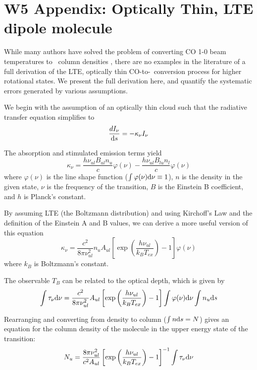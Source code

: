 \section{W5 Appendix: Optically Thin, LTE dipole molecule}
\label{appendix:dipole}
While many authors have solved the problem of converting CO 1-0 beam
temperatures to \hh\ column densities
\citep{garden1991,bourke1997,Cabrit1990,lada1996}, there are no  examples in
the literature of a full derivation of the LTE, optically thin CO-to-\hh\
conversion process for higher rotational states.  We present the full
derivation here, and quantify the systematic errors generated by various
assumptions.

We begin with the assumption of an optically thin cloud such that the radiative
transfer equation \citep[][eqn 1.9]{rohlfs} simplifies to
\begin{equation}
  \label{eqn:radtrans}
  \frac{dI_\nu}{\textrm{d}s} = -\kappa_\nu I_\nu 
\end{equation}

The absorption and stimulated emission terms yield 
\begin{equation}
  \label{eqn:kappa}
  \kappa_\nu = \frac{h \nu_{ul} B_{ul} n_u}{c} \varphi(\nu)
              -\frac{h \nu_{ul} B_{lu} n_l}{c} \varphi(\nu)
\end{equation}
where $\varphi(\nu)$ is the line shape function ($\int\varphi(\nu) \textrm{d}\nu \equiv
1$), $n$ is the density in the given state, $\nu$ is the frequency of the transition,
$B$ is the Einstein B coefficient, and $h$ is Planck's constant.

By assuming LTE (the Boltzmann distribution) and using Kirchoff's Law and the definition of 
the Einstein A and B values, we can derive a more useful version of this equation
\begin{equation}
  \kappa_\nu = \frac{c^2}{8 \pi \nu_{ul}^2} n_u A_{ul} \left[\exp\left(\frac{h \nu_{ul} }{k_B T_{ex}}\right) - 1 \right] \varphi(\nu)
\end{equation}
where $k_B$ is Boltzmann's constant.

The observable $T_B$ can be related to the optical depth, which is given by 
\begin{equation}
  \int \tau_\nu \textrm{d}\nu = \frac{c^2}{8 \pi \nu_{ul}^2} A_{ul} \left[\exp\left(\frac{h \nu_{ul} }{k_B T_{ex}}\right) - 1 \right] \int \varphi(\nu) \textrm{d}\nu \int n_u \textrm{d}s 
\end{equation}

Rearranging and converting from density to column ($\int n \textrm{d}s = N$) gives an equation for the column density
of the molecule in the upper energy state of the transition:
\begin{equation}
  \label{eqn:nuppertau}
  N_u = \frac{8\pi \nu_{ul}^2}{c^2 A_{ul}} \left[\exp\left(\frac{h \nu_{ul} }{k_B T_{ex}}\right) - 1 \right]^{-1} \int \tau_\nu \textrm{d}\nu
\end{equation}

